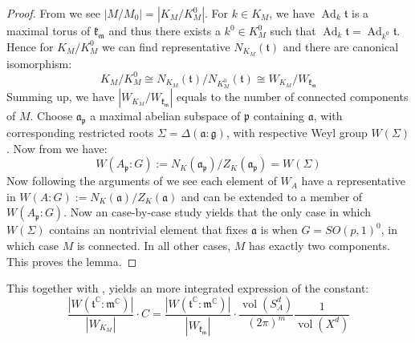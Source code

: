\documentclass[11pt]{report}
\theoremstyle{definition}
\theoremstyle{plain}
\DeclareMathOperator{\Ad}{Ad}
\DeclareMathOperator{\vol}{vol}
\newcommand{\complex}{\mathbb{C}}
\newcommand{\Lie}[1]{\mathfrak{#1}}
\begin{document}
\begin{proof}
From \cite[Propsition~7.19(b)]{knapp2013} we see $|M/M_0|=|K_M/K_M^0|$. For $k\in K_M$, we have $\Ad_k\Lie{t}$ is a maximal torus of $\Lie{k_m}$ and thus there exists a $k^0\in K_M^0$ such that $\Ad_k\Lie{t}=\Ad_{k^0}\Lie{t}$. Hence for $K_M/K_M^0$ we can find representative $N_{K_M}(\Lie{t})$ and there are canonical isomorphism:
\begin{equation}
K_M/K_M^0\cong N_{K_M}(\Lie{t})/N_{K^0_M}(\Lie{t})\cong W_{K_M}/W_{\Lie{k_m}}
\end{equation} 
Summing up, we have $|W_{K_M}/W_{\Lie{k_m}}|$ equals to the number of connected components of $M$. Choose $\Lie{a_p}$ a maximal abelian subspace of $\Lie{p}$ containing $\Lie{a}$, with corresponding restricted roots $\Sigma=\Delta(\Lie{a}:\Lie{g})$, with respective Weyl group $W(\Sigma)$. Now from \cite[Theorem~5.17]{knapp2016} we have:
\begin{equation}
W(A_\Lie{p}:G):=N_K(\Lie{a_p})/Z_K(\Lie{a_p})=W(\Sigma)
\end{equation}
Now following the arguments of \cite[Proposition~7.85]{knapp2013} we see each element of $W_A$ have a representative in $W(A:G):=N_K(\Lie{a})/Z_K(\Lie{a})$ and can be extended to a member of $W(A_\Lie{p}:G)$. Now an case-by-case study yields that the only case in which $W(\Sigma)$ contains an nontrivial element that fixes $\Lie{a}$ is when $G=SO(p,1)^0$, in which case $M$ is connected. In all other cases, $M$ has exactly two components. This proves the lemma.
\end{proof}
This together with , yields an more integrated expression of the constant:
\begin{equation}\label{constant term}
\frac{|W(\Lie{t}^\complex:\Lie{m}^\complex)|}{|W_{K_M}|}\cdot C=\frac{|W(\Lie{t}^\complex:\Lie{m}^\complex)|}{|W_\Lie{k_m}|}\cdot\frac{\vol(S^d_A)}{(2\pi)^m}\frac{1}{\vol(X^d)}
\end{equation}
\end{document}
